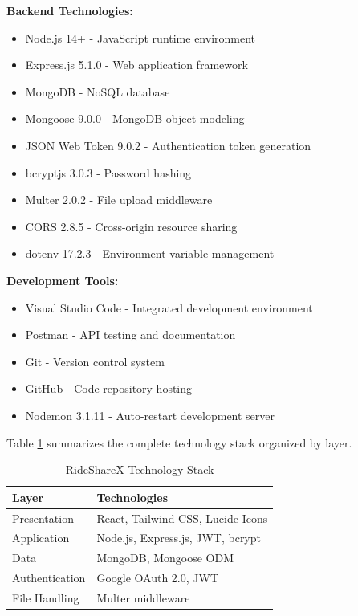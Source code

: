 \documentclass[12pt,a4paper]{report}
\begin{document}
	\textbf{Backend Technologies:}
	\begin{itemize}
		\item Node.js 14+ - JavaScript runtime environment
		\item Express.js 5.1.0 - Web application framework
		\item MongoDB - NoSQL database
		\item Mongoose 9.0.0 - MongoDB object modeling
		\item JSON Web Token 9.0.2 - Authentication token generation
		\item bcryptjs 3.0.3 - Password hashing
		\item Multer 2.0.2 - File upload middleware
		\item CORS 2.8.5 - Cross-origin resource sharing
		\item dotenv 17.2.3 - Environment variable management
	\end{itemize}
	
	\textbf{Development Tools:}
	\begin{itemize}
		\item Visual Studio Code - Integrated development environment
		\item Postman - API testing and documentation
		\item Git - Version control system
		\item GitHub - Code repository hosting
		\item Nodemon 3.1.11 - Auto-restart development server
	\end{itemize}
	
	Table \ref{table:techstack} summarizes the complete technology stack organized by layer.

	\begin{table}[h!]
		\caption{RideShareX Technology Stack}
		\label{table:techstack}
		\centering
		\begin{tabular}{|l|l|}
			\hline
			\textbf{Layer} & \textbf{Technologies}\\ \hline
			Presentation & React, Tailwind CSS, Lucide Icons \\ \hline
			Application & Node.js, Express.js, JWT, bcrypt \\ \hline
			Data & MongoDB, Mongoose ODM \\ \hline
			Authentication & Google OAuth 2.0, JWT \\ \hline
			File Handling & Multer middleware \\ \hline
		\end{tabular}
	\end{table}
	
\end{document}
